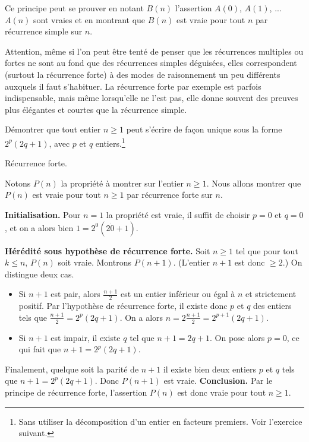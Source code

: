 Ce principe peut se prouver en notant $B(n)$ l'assertion \og $A(0)$, $A(1)$, ... $A(n)$ sont vraies\fg{} et en montrant que $B(n)$ est vraie pour tout $n$ par récurrence simple sur $n$.

Attention, même si l'on peut être tenté de penser que les récurrences multiples ou fortes ne sont au fond \og que\fg{} des récurrences simples déguisées, elles correspondent (surtout la récurrence forte) à des modes de raisonnement un peu différents auxquels il faut s'habituer. La récurrence forte par exemple est parfois indispensable, mais même lorsqu'elle ne l'est pas, elle donne souvent des preuves plus élégantes et courtes que la récurrence simple.

\begin{exo}
Démontrer que tout entier $n\geq 1$ peut s'écrire de façon unique sous la forme $2^p(2q+1)$, avec $p$ et $q$ entiers.\footnote{Sans utiliser la décomposition d'un entier en facteurs premiers. Voir l'exercice suivant.}
\begin{hint}
Récurrence forte.
\end{hint}
\begin{sol}
Notons $P(n)$ la propriété à montrer sur l'entier $n\geq 1$. Nous allons montrer que $P(n)$ est vraie pour tout $n\geq 1$ par récurrence forte sur $n$.

\noindent\textbf{Initialisation.} Pour $n=1$ la propriété est vraie, il suffit de choisir $p=0$ et $q=0$, et on a alors bien $1=2^0(2\dot 0+1)$.

\noindent\textbf{Hérédité sous hypothèse de récurrence forte.} 
Soit $n\geq 1$ tel que pour tout $k\leq n$, $P(n)$ soit vraie. Montrons $P(n+1)$. (L'entier $n+1$ est donc $\geq 2$.) On distingue deux cas.
\begin{itemize}
\item Si $n+1$ est pair, alors $\frac{n+1}{2}$ est un entier inférieur ou égal à $n$ et strictement positif. Par l'hypothèse de récurrence forte, il existe donc $p$ et $q$ des entiers tels que $\frac{n+1}{2} = 2^p(2q+1)$. On a alors $\boxed{n = 2\frac{n+1}{2} = 2^{p+1}(2q+1)}$.
\item Si $n+1$ est impair, il existe $q$ tel que $n+1 = 2q+1$. On pose alors $p=0$, ce qui fait que $n+1=2^p(2q+1)$.
\end{itemize}
Finalement, quelque soit la parité de $n+1$ il existe bien deux entiers $p$ et $q$ tels que $n+1=2^p(2q+1)$. Donc $P(n+1)$ est vraie.
\noindent\textbf{Conclusion.} Par le principe de récurrence forte, l'assertion $P(n)$ est donc vraie pour tout $n\geq 1$. 
\end{sol}
\end{exo}


